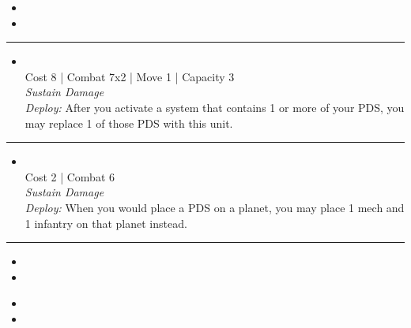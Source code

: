 \begin{multicols}{2}
\begin{itemize}
\item \antimass
\item \scanlink
\end{itemize}

\vspace{-10pt}\rule{\hsize}{0.4pt}\vspace{5pt}


\begin{itemize}
\item {}\\
Cost 8 | Combat 7x2 | Move 1 | Capacity 3 \\
\emph{Sustain Damage}\\
\emph{Deploy:} After you activate a system that contains 1 or more of your PDS, you may replace 1 of those PDS with this unit.
\end{itemize}

\vspace{-10pt}\rule{\hsize}{0.4pt}\vspace{5pt}


\begin{itemize}
\item {}
\\
Cost 2 | Combat 6 \\
\emph{Sustain Damage}\\
\emph{Deploy:} When you would place a PDS on a planet, you may place 1 mech and 1 infantry on that planet instead.
\end{itemize}

\vspace{-10pt}\rule{\hsize}{0.4pt}\vspace{5pt}


\begin{itemize}
\item \helTitanI
\item \saturnEngineI
\end{itemize}

\columnbreak
{}

\begin{itemize}
\item \helTitanII
\item \saturnEngineII
\end{itemize}


\end{multicols}
